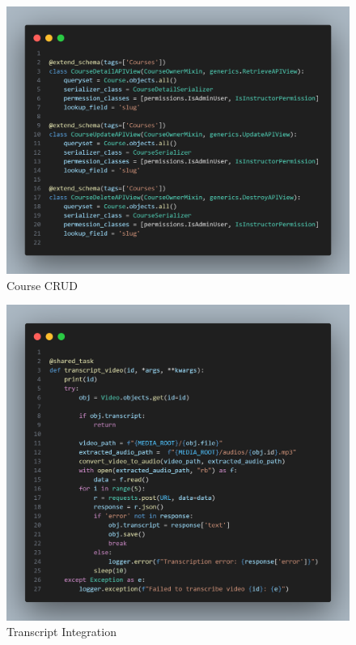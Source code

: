 \begin{figure}[h!]
	\centering
	\includegraphics[max height=\textheight,max width=\textwidth]{figures/srccode/course-crud.png}
	\caption{Course CRUD}
\end{figure}

\begin{figure}[h!]
	\centering
	\includegraphics[max height=\textheight,max width=\textwidth]{figures/srccode/transcript-integrations.png}
	\caption{Transcript Integration}
\end{figure}

